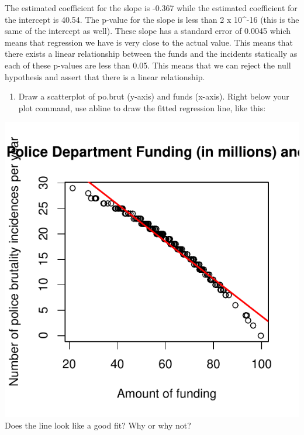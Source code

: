 \documentclass[
]{article}
\newenvironment{Shaded}{\begin{snugshade}}{\end{snugshade}}
\newcommand{\AttributeTok}[1]{\textcolor[rgb]{0.77,0.63,0.00}{#1}}
\newcommand{\CommentTok}[1]{\textcolor[rgb]{0.56,0.35,0.01}{\textit{#1}}}
\newcommand{\DecValTok}[1]{\textcolor[rgb]{0.00,0.00,0.81}{#1}}
\newcommand{\FunctionTok}[1]{\textcolor[rgb]{0.00,0.00,0.00}{#1}}
\newcommand{\NormalTok}[1]{#1}
\newcommand{\SpecialCharTok}[1]{\textcolor[rgb]{0.00,0.00,0.00}{#1}}
\newcommand{\StringTok}[1]{\textcolor[rgb]{0.31,0.60,0.02}{#1}}
\providecommand{\tightlist}{%
  \setlength{\itemsep}{0pt}\setlength{\parskip}{0pt}}
\begin{document}
The estimated coefficient for the slope is -0.367 while the estimated
coefficient for the intercept is 40.54. The p-value for the slope is
less than 2 x 10\^{}-16 (this is the same of the intercept as well).
These slope has a standard error of 0.0045 which means that regression
we have is very close to the actual value. This means that there exists
a linear relationship between the funds and the incidents statically as
each of these p-values are less than 0.05. This means that we can reject
the null hypothesis and assert that there is a linear relationship.

\begin{enumerate}
\def\labelenumi{\alph{enumi}.}
\setcounter{enumi}{2}
\tightlist
\item
  Draw a scatterplot of po.brut (y-axis) and funds (x-axis). Right below
  your plot command, use abline to draw the fitted regression line, like
  this:
\end{enumerate}

\begin{Shaded}
\end{Shaded}

\includegraphics{Journal_files/figure-latex/unnamed-chunk-33-1.pdf} Does
the line look like a good fit? Why or why not?
\end{document}
